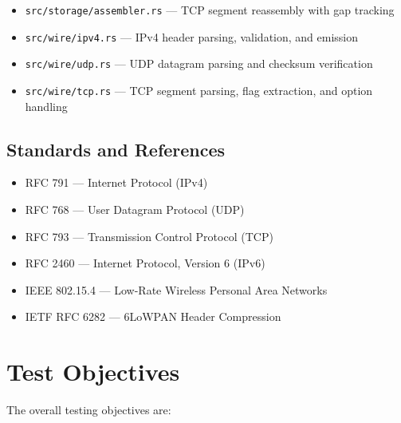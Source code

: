 \documentclass[11pt,a4paper]{article}
\begin{document}
\begin{itemize}[noitemsep]
\item \texttt{src/storage/assembler.rs} --- TCP segment reassembly with gap tracking
\item \texttt{src/wire/ipv4.rs} --- IPv4 header parsing, validation, and emission
\item \texttt{src/wire/udp.rs} --- UDP datagram parsing and checksum verification
\item \texttt{src/wire/tcp.rs} --- TCP segment parsing, flag extraction, and option handling
\end{itemize}

\subsection{Standards and References}

\begin{itemize}[noitemsep]
\item RFC 791 --- Internet Protocol (IPv4)
\item RFC 768 --- User Datagram Protocol (UDP)
\item RFC 793 --- Transmission Control Protocol (TCP)
\item RFC 2460 --- Internet Protocol, Version 6 (IPv6)
\item IEEE 802.15.4 --- Low-Rate Wireless Personal Area Networks
\item IETF RFC 6282 --- 6LoWPAN Header Compression
\end{itemize}

\section{Test Objectives}

The overall testing objectives are:
\end{document}
